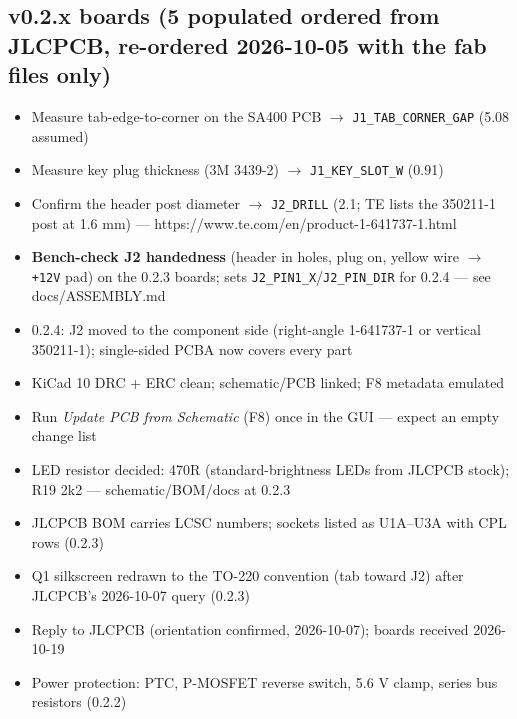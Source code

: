 \documentclass[11pt,a4paper]{article}
\begin{document}
\subsection*{v0.2.x boards (5 populated ordered from JLCPCB, re-ordered 2026-10-05 with the fab files only)}
\begin{itemize}[leftmargin=8mm]
\item[$\square$] Measure tab-edge-to-corner on the SA400 PCB $\to$ \texttt{J1\_TAB\_CORNER\_GAP} (5.08 assumed)
\item[$\square$] Measure key plug thickness (3M 3439-2) $\to$ \texttt{J1\_KEY\_SLOT\_W} (0.91)
\item[$\square$] Confirm the header post diameter $\to$ \texttt{J2\_DRILL} (2.1; TE lists the 350211-1 post at 1.6 mm) — https://www.te.com/en/product-1-641737-1.html
\item[$\square$] \textbf{Bench-check J2 handedness} (header in holes, plug on, yellow wire $\to$ \texttt{+12V} pad) on the 0.2.3 boards; sets \texttt{J2\_PIN1\_X}/\texttt{J2\_PIN\_DIR} for 0.2.4 — see docs/ASSEMBLY.md
\item[$\square$] 0.2.4: J2 moved to the component side (right-angle 1-641737-1 or vertical 350211-1); single-sided PCBA now covers every part
\item[$\boxtimes$] KiCad 10 DRC + ERC clean; schematic/PCB linked; F8 metadata emulated
\item[$\square$] Run \emph{Update PCB from Schematic} (F8) once in the GUI — expect an empty change list
\item[$\boxtimes$] LED resistor decided: 470R (standard-brightness LEDs from JLCPCB stock); R19 2k2 — schematic/BOM/docs at 0.2.3
\item[$\boxtimes$] JLCPCB BOM carries LCSC numbers; sockets listed as U1A–U3A with CPL rows (0.2.3)
\item[$\boxtimes$] Q1 silkscreen redrawn to the TO-220 convention (tab toward J2) after JLCPCB's 2026-10-07 query (0.2.3)
\item[$\boxtimes$] Reply to JLCPCB (orientation confirmed, 2026-10-07); boards received 2026-10-19
\item[$\boxtimes$] Power protection: PTC, P-MOSFET reverse switch, 5.6 V clamp, series bus resistors (0.2.2)
\end{itemize}
\end{document}
